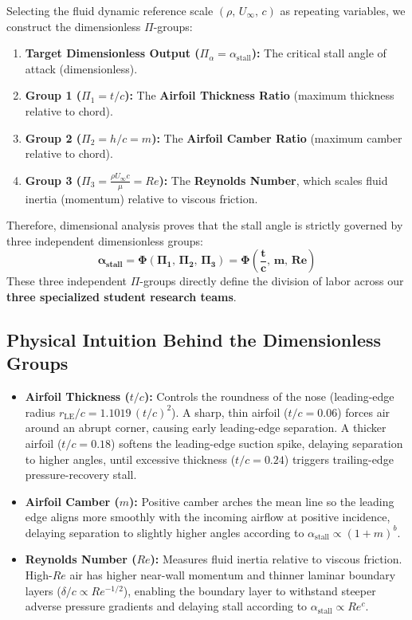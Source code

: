 \documentclass[11pt,a4paper]{article}
\begin{document}
Selecting the fluid dynamic reference scale $(\rho,\, U_\infty,\, c)$ as repeating variables, we construct the dimensionless $\Pi$-groups:
\begin{enumerate}[leftmargin=*]
    \item \textbf{Target Dimensionless Output ($\Pi_{\alpha} = \alpha_{\text{stall}}$):} The critical stall angle of attack (dimensionless).
    \item \textbf{Group 1 ($\Pi_1 = t/c$):} The \textbf{Airfoil Thickness Ratio} (maximum thickness relative to chord).
    \item \textbf{Group 2 ($\Pi_2 = h/c = m$):} The \textbf{Airfoil Camber Ratio} (maximum camber relative to chord).
    \item \textbf{Group 3 ($\Pi_3 = \frac{\rho U_\infty c}{\mu} = Re$):} The \textbf{Reynolds Number}, which scales fluid inertia (momentum) relative to viscous friction.
\end{enumerate}

Therefore, dimensional analysis proves that the stall angle is strictly governed by three independent dimensionless groups:
\begin{equation}
\mathbf{\alpha_{\text{stall}} = \Phi\left(\Pi_1,\, \Pi_2,\, \Pi_3\right) = \Phi\left(\frac{t}{c},\, m,\, Re\right)}
\end{equation}
These three independent $\Pi$-groups directly define the division of labor across our \textbf{three specialized student research teams}.

\subsection{Physical Intuition Behind the Dimensionless Groups}
\begin{itemize}[leftmargin=*]
    \item \textbf{Airfoil Thickness ($t/c$):} Controls the roundness of the nose (leading-edge radius $r_{\text{LE}}/c = 1.1019\,(t/c)^2$). A sharp, thin airfoil ($t/c = 0.06$) forces air around an abrupt corner, causing early leading-edge separation. A thicker airfoil ($t/c = 0.18$) softens the leading-edge suction spike, delaying separation to higher angles, until excessive thickness ($t/c = 0.24$) triggers trailing-edge pressure-recovery stall.
    
    \item \textbf{Airfoil Camber ($m$):} Positive camber arches the mean line so the leading edge aligns more smoothly with the incoming airflow at positive incidence, delaying separation to slightly higher angles according to $\alpha_{\text{stall}} \propto (1+m)^b$.
    
    \item \textbf{Reynolds Number ($Re$):} Measures fluid inertia relative to viscous friction. High-$Re$ air has higher near-wall momentum and thinner laminar boundary layers ($\delta/c \propto Re^{-1/2}$), enabling the boundary layer to withstand steeper adverse pressure gradients and delaying stall according to $\alpha_{\text{stall}} \propto Re^c$.
\end{itemize}
\end{document}
